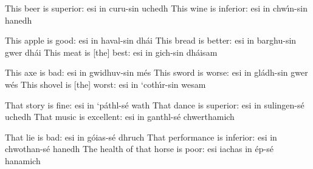 This beer is superior: esi in curu-sin uchedh
This wine is inferior: esi in chw\'{\i}n-sin hanedh

This apple is good: esi in haval-sin dh\'{a}i
This bread is better: esi in barghu-sin gwer dh\'{a}i
This meat is [the] best: esi in gich-sin dh\'{a}isam

This axe is bad: esi in gwidhuv-sin m\'{e}s
This sword is worse: esi in gl\'{a}dh-sin gwer w\'{e}s
This shovel is [the] worst: esi in ‘coth\'{\i}r-sin wesam

That story is fine: esi in ‘p\'{a}thl-s\'{e} wath
That dance is superior: esi in sulingen-s\'{e} uchedh
That music is excellent: esi in ganthl-s\'{e} chwerthamich

That lie is bad: esi in g\'{o}ias-s\'{e} dhruch
That performance is inferior: esi in chwothan-s\'{e} hanedh
The health of that horse is poor: esi iachas in \'{e}p-s\'{e} hanamich
